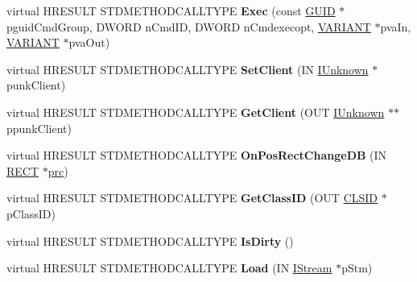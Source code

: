 \begin{DoxyCompactItemize}
\item 
\mbox{\label{class_c_task_band_a58601eeaf49d5dce83b63845188ccabd}} 
virtual H\+R\+E\+S\+U\+LT S\+T\+D\+M\+E\+T\+H\+O\+D\+C\+A\+L\+L\+T\+Y\+PE {\bfseries Exec} (const \hyperlink{interface_g_u_i_d}{G\+U\+ID} $\ast$pguid\+Cmd\+Group, D\+W\+O\+RD n\+Cmd\+ID, D\+W\+O\+RD n\+Cmdexecopt, \hyperlink{structtag_v_a_r_i_a_n_t}{V\+A\+R\+I\+A\+NT} $\ast$pva\+In, \hyperlink{structtag_v_a_r_i_a_n_t}{V\+A\+R\+I\+A\+NT} $\ast$pva\+Out)
\item 
\mbox{\label{class_c_task_band_a3c04717b728bc8ca4b98ba33efc64a0b}} 
virtual H\+R\+E\+S\+U\+LT S\+T\+D\+M\+E\+T\+H\+O\+D\+C\+A\+L\+L\+T\+Y\+PE {\bfseries Set\+Client} (IN \hyperlink{interface_i_unknown}{I\+Unknown} $\ast$punk\+Client)
\item 
\mbox{\label{class_c_task_band_a794aeb636cc08583d3d309b4861f6832}} 
virtual H\+R\+E\+S\+U\+LT S\+T\+D\+M\+E\+T\+H\+O\+D\+C\+A\+L\+L\+T\+Y\+PE {\bfseries Get\+Client} (O\+UT \hyperlink{interface_i_unknown}{I\+Unknown} $\ast$$\ast$ppunk\+Client)
\item 
\mbox{\label{class_c_task_band_a157ec99fe5c52ac09d2b8f66b61f9fca}} 
virtual H\+R\+E\+S\+U\+LT S\+T\+D\+M\+E\+T\+H\+O\+D\+C\+A\+L\+L\+T\+Y\+PE {\bfseries On\+Pos\+Rect\+Change\+DB} (IN \hyperlink{structtag_r_e_c_t}{R\+E\+CT} $\ast$\hyperlink{structtag_r_e_c_t}{prc})
\item 
\mbox{\label{class_c_task_band_a8ce0bcdbb3e799740da5c1b7bcd69cd5}} 
virtual H\+R\+E\+S\+U\+LT S\+T\+D\+M\+E\+T\+H\+O\+D\+C\+A\+L\+L\+T\+Y\+PE {\bfseries Get\+Class\+ID} (O\+UT \hyperlink{struct___i_i_d}{C\+L\+S\+ID} $\ast$p\+Class\+ID)
\item 
\mbox{\label{class_c_task_band_a64c63bef4f252a9f6450171119891fd0}} 
virtual H\+R\+E\+S\+U\+LT S\+T\+D\+M\+E\+T\+H\+O\+D\+C\+A\+L\+L\+T\+Y\+PE {\bfseries Is\+Dirty} ()
\item 
\mbox{\label{class_c_task_band_a15663931f8ddb82161e9119129c09433}} 
virtual H\+R\+E\+S\+U\+LT S\+T\+D\+M\+E\+T\+H\+O\+D\+C\+A\+L\+L\+T\+Y\+PE {\bfseries Load} (IN \hyperlink{interface_i_stream}{I\+Stream} $\ast$p\+Stm)
\item 
$$
\end{DoxyCompactItemize}
